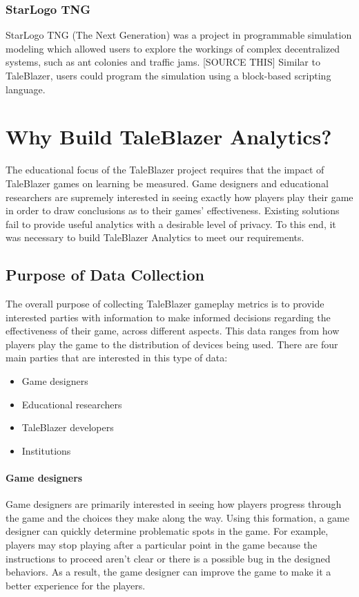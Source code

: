 \subsubsection{StarLogo TNG}

StarLogo TNG (The Next Generation) was a project in programmable simulation modeling which allowed users to explore the workings of complex decentralized systems, such as ant colonies and traffic jams. [SOURCE THIS] Similar to TaleBlazer, users could program the simulation using a block-based scripting language. 

\section{Why Build TaleBlazer Analytics?}

The educational focus of the TaleBlazer project requires that the impact of TaleBlazer games on learning be measured. Game designers and educational researchers are supremely interested in seeing exactly how players play their game in order to draw conclusions as to their games' effectiveness. Existing solutions fail to provide useful analytics with a desirable level of privacy. To this end, it was necessary to build TaleBlazer Analytics to meet our requirements. 

\subsection{Purpose of Data Collection}

The overall purpose of collecting TaleBlazer gameplay metrics is to provide interested parties with information to make informed decisions regarding the effectiveness of their game, across different aspects. This data ranges from how players play the game to the distribution of devices being used. There are four main parties that are interested in this type of data: 
	\begin{itemize}
		\item Game designers
		\item Educational researchers
		\item TaleBlazer developers
		\item Institutions
	\end{itemize}

\paragraph{Game designers}
Game designers are primarily interested in seeing how players progress through the game and the choices they make along the way. Using this formation, a game designer can quickly determine problematic spots in the game. For example, players may stop playing after a particular point in the game because the instructions to proceed aren't clear or there is a possible bug in the designed behaviors. As a result, the game designer can improve the game to make it a better experience for the players.

